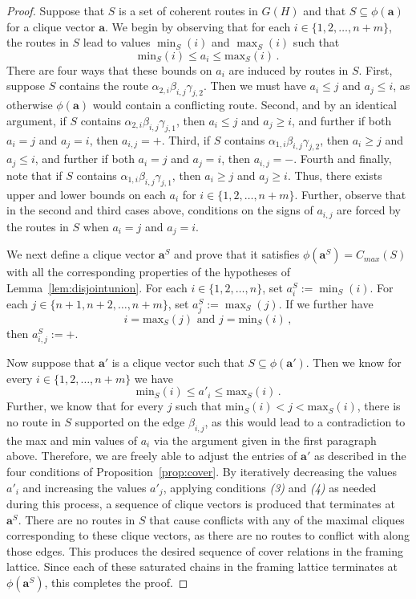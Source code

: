 \documentclass[12pt]{amsart}
\theoremstyle{definition}
\newcommand\ba{\mathbf{a}}
\begin{document}
\begin{proof}
    Suppose that $S$ is a set of coherent routes in $G(H)$ and that $S\subseteq \phi(\ba)$ for a clique vector $\ba$.
    We begin by observing that for each $i\in \{1,2,\ldots,n+m\}$, the routes in $S$ lead to values $\min_S(i)$ and $\max_S(i)$ such that 
    \[
    \mathrm{min}_S(i)\leq a_i\leq \mathrm{max}_S(i) \, .
    \]
    There are four ways that these bounds on $a_i$ are induced by routes in $S$.
    First, suppose $S$ contains the route $\alpha_{2,i}\beta_{i,j}\gamma_{j,2}$.
    Then we must have $a_i\leq j$ and $a_j\leq i$, as otherwise $\phi(\ba)$ would contain a conflicting route.
    Second, and by an identical argument, if $S$ contains $\alpha_{2,i}\beta_{i,j}\gamma_{j,1}$, then $a_i\leq j$ and $a_j\geq i$, and further if both $a_i=j$ and $a_j=i$, then $a_{i,j}=+$.
    Third, if $S$ contains $\alpha_{1,i}\beta_{i,j}\gamma_{j,2}$, then $a_i\geq j$ and $a_j\leq i$, and further if both $a_i=j$ and $a_j=i$, then $a_{i,j}=-$.
    Fourth and finally, note that if $S$ contains $\alpha_{1,i}\beta_{i,j}\gamma_{j,1}$, then $a_i\geq j$ and $a_j\geq i$.
    Thus, there exists upper and lower bounds on each $a_i$ for $i\in\{1,2,\ldots,n+m\}$.
    Further, observe that in the second and third cases above, conditions on the signs of $a_{i,j}$ are forced by the routes in $S$ when $a_i=j$ and $a_j=i$.

    We next define a clique vector $\ba^S$ and prove that it satisfies $\phi(\ba^S)=C_{max}(S)$ with all the corresponding properties of the hypotheses of Lemma~\ref{lem:disjointunion}.
    For each $i\in \{1,2,\ldots,n\}$, set $a^S_i:=\min_S(i)$.
    For each $j\in \{n+1,n+2,\ldots,n+m\}$, set $a^S_j:=\max_S(j)$.
    If we further have
    \[
    i=\mathrm{max}_S(j) \text{ and } j=\mathrm{min}_S(i) \, ,
    \]
    then $a^S_{i,j}:=+$.

    Now suppose that $\ba'$ is a clique vector such that $S\subseteq \phi(\ba')$.
    Then we know for every $i\in \{1,2,\ldots,n+m\}$ we have
    \[
    \mathrm{min}_S(i)\leq a'_i\leq \mathrm{max}_S(i) \, .
    \]
    Further, we know that for every $j$ such that $\mathrm{min}_S(i)< j < \mathrm{max}_S(i)$, there is no route in $S$ supported on the edge $\beta_{i,j}$, as this would lead to a contradiction to the max and min values of $a_i$ via the argument given in the first paragraph above.
    Therefore, we are freely able to adjust the entries of $\ba'$ as described in the four conditions of Proposition~\ref{prop:cover}. 
    By iteratively decreasing the values $a'_i$ and increasing the values $a'_j$, applying conditions \emph{(3)} and \emph{(4)} as needed during this process, a sequence of clique vectors is produced that terminates at $\ba^S$.
    There are no routes in $S$ that cause conflicts with any of the maximal cliques corresponding to these clique vectors, as there are no routes to conflict with along those edges.
    This produces the desired sequence of cover relations in the framing lattice.
    Since each of these saturated chains in the framing lattice terminates at $\phi(\ba^S)$, this completes the proof.
    \end{proof}
\end{document}
